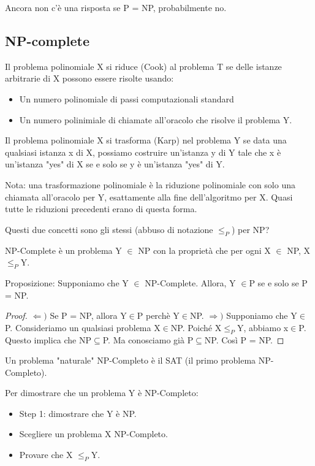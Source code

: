 \documentclass{article}
\begin{document}
\noindent Ancora non c'è una risposta se P = NP, probabilmente no. %
\subsection{NP-complete}
Il problema polinomiale X si riduce (Cook) al problema T se delle istanze arbitrarie di X possono essere risolte usando:
\begin{itemize}
    \item Un numero polinomiale di passi computazionali standard
    \item Un numero polinimiale di chiamate all'oracolo che risolve il problema Y.
\end{itemize}

\noindent Il problema polinomiale X si trasforma (Karp) nel problema Y se data una qualsiasi istanza x di X, possiamo costruire un'istanza y di Y tale che x è un'istanza "yes" di X se e solo se y è un'istanza "yes" di Y.

\noindent Nota: una trasformazione polinomiale è la riduzione polinomiale con solo una chiamata all'oracolo per Y, esattamente alla fine dell'algoritmo per X. Quasi tutte le riduzioni precedenti erano di questa forma.

\noindent Questi due concetti sono gli stessi (abbuso di notazione $\leq_P$) per NP?

\noindent NP-Complete è un problema Y $\in$ NP con la proprietà che per ogni X $\in$ NP, X $\leq_P$Y. 

\noindent Proposizione: Supponiamo che Y $\in$ NP-Complete. Allora, Y $\in$P se e solo se P = NP.
\begin{proof}
    $\Leftarrow)$ Se P = NP, allora Y$\in$P perchè Y$\in$NP.
    $\Rightarrow)$ Supponiamo che Y$\in$P. Consideriamo un qualsiasi problema X$\in$NP. Poiché X$\leq_P$Y, abbiamo x$\in$P. Questo implica che NP$\subseteq$P. Ma conosciamo già P$\subseteq$NP. Così P = NP.
\end{proof}
Un problema "naturale" NP-Completo è il SAT (il primo problema NP-Completo). 

\noindent Per dimostrare che un problema Y è NP-Completo:
\begin{itemize}
    \item Step 1: dimostrare che Y è NP.
    \item  Scegliere un problema X NP-Completo.
    \item Provare che X $\leq_P$Y.
\end{itemize}
\end{document}
